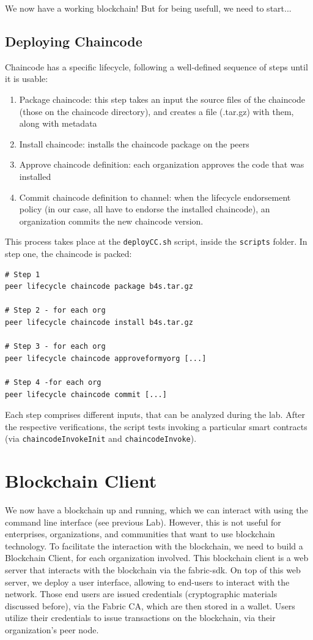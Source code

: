 \documentclass[12pt,a4paper]{article}
\theoremstyle{definition}
\begin{document}
We now have a working blockchain! But for being usefull, we need to start...

\subsection{Deploying Chaincode}

Chaincode has a specific lifecycle, following a well-defined sequence of steps until it is usable:

\begin{enumerate}
\item Package chaincode: this step takes an input the source files of the chaincode (those on the chaincode directory), and creates a file (.tar.gz) with them, along with metadata
\item Install chaincode: installs the chaincode package on the peers
\item Approve chaincode definition: each organization approves the code that was installed 
\item Commit chaincode definition to channel: when the lifecycle endorsement policy (in our case, all have to endorse the installed chaincode), an organization commits the new chaincode version.
\end{enumerate}

This process takes place at the \texttt{deployCC.sh} script, inside the \texttt{scripts} folder. In step one, the chaincode is packed:

\begin{verbatim}
# Step 1
peer lifecycle chaincode package b4s.tar.gz

# Step 2 - for each org
peer lifecycle chaincode install b4s.tar.gz

# Step 3 - for each org
peer lifecycle chaincode approveformyorg [...]

# Step 4 -for each org
peer lifecycle chaincode commit [...]
\end{verbatim}

Each step comprises different inputs, that can be analyzed during the lab. After the respective verifications, the script tests invoking a particular smart contracts (via \texttt{chaincodeInvokeInit} and \texttt{chaincodeInvoke}). 

\section{Blockchain Client}
We now have a blockchain up and running, which we can interact with using the command line interface (see previous Lab). However, this is not useful for enterprises, organizations, and communities that want to use blockchain technology. To facilitate the interaction with the blockchain, we need to build a Blockchain Client, for each organization involved. This blockchain client is a web server that interacts with the blockchain via the fabric-sdk. On top of this web server, we deploy a user interface, allowing to end-users to interact with the network. Those end users are issued credentials (cryptographic materials discussed before), via the Fabric CA, which are then stored in a wallet. Users utilize their credentials to issue transactions on the blockchain, via their organization's peer node.
\end{document}
